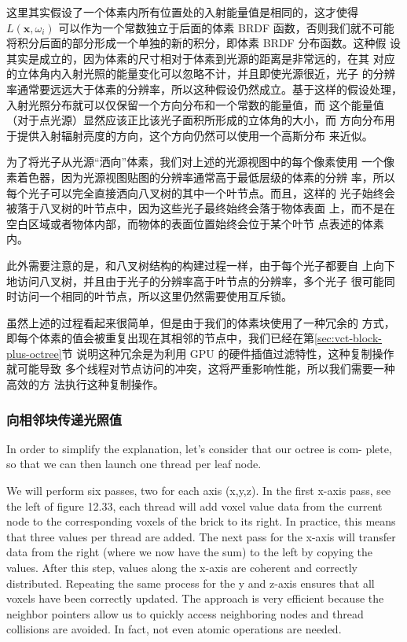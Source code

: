 这里其实假设了一个体素内所有位置处的入射能量值是相同的，这才使得 $L(\mathbf{x}, \omega_i)$ 可以作为一个常数独立于后面的体素 BRDF 函数，否则我们就不可能 将积分后面的部分形成一个单独的新的积分，即体素 BRDF 分布函数。这种假 设其实是成立的，因为体素的尺寸相对于体素到光源的距离是非常远的，在其 对应的立体角内入射光照的能量变化可以忽略不计，并且即使光源很近，光子 的分辨率通常要远远大于体素的分辨率，所以这种假设仍然成立。基于这样的假设处理，入射光照分布就可以仅保留一个方向分布和一个常数的能量值，而 这个能量值（对于点光源）显然应该正比该光子面积所形成的立体角的大小，而 方向分布用于提供入射辐射亮度的方向，这个方向仍然可以使用一个高斯分布 来近似。

为了将光子从光源“洒向”体素，我们对上述的光源视图中的每个像素使用 一个像素着色器，因为光源视图贴图的分辨率通常高于最低层级的体素的分辨 率，所以每个光子可以完全直接洒向八叉树的其中一个叶节点。而且，这样的 光子始终会被落于八叉树的叶节点中，因为这些光子最终始终会落于物体表面 上，而不是在空白区域或者物体内部，而物体的表面位置始终会位于某个叶节 点表述的体素内。

此外需要注意的是，和八叉树结构的构建过程一样，由于每个光子都要自 上向下地访问八叉树，并且由于光子的分辨率高于叶节点的分辨率，多个光子 很可能同时访问一个相同的叶节点，所以这里仍然需要使用互斥锁。

虽然上述的过程看起来很简单，但是由于我们的体素块使用了一种冗余的 方式，即每个体素的值会被重复出现在其相邻的节点中，我们已经在第\ref{sec:vct-block-plus-octree}节 说明这种冗余是为利用 GPU 的硬件插值过滤特性，这种复制操作就可能导致 多个线程对节点访问的冲突，这将严重影响性能，所以我们需要一种高效的方 法执行这种复制操作。





\subsubsection{向相邻块传递光照值}
In order to simplify the explanation, let’s consider that our octree is com- plete, so that we can then launch one thread per leaf node.

We will perform six passes, two for each axis (x,y,z). In the first x-axis pass, see the left of figure 12.33, each thread will add voxel value data from the current node to the corresponding voxels of the brick to its right. In practice, this means that three values per thread are added. The next pass for the x-axis will transfer data from the right (where we now have the sum) to the left by copying the values. After this step, values along the x-axis are coherent and correctly distributed. Repeating the same process for the y and z-axis ensures that all voxels have been correctly updated. The approach is very efficient because the neighbor pointers allow us to quickly access neighboring nodes and thread collisions are avoided. In fact, not even atomic operations are needed.

